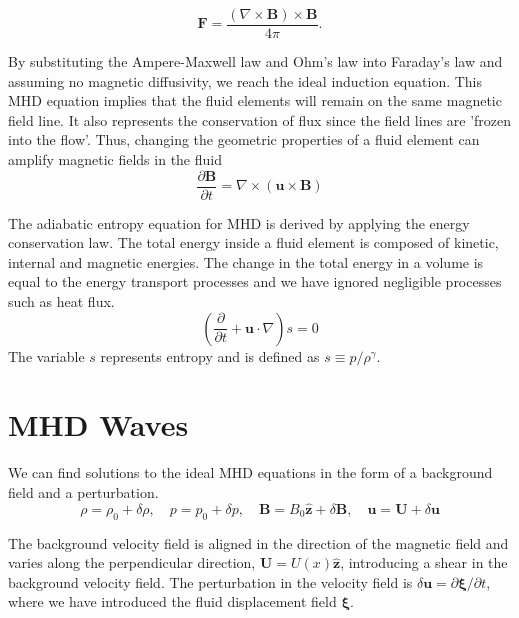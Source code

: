 \begin{equation*}
    \boldsymbol{F} = \frac{(\nabla \times \boldsymbol{B}) \times \boldsymbol{B}}{4\pi}.
\end{equation*}

By substituting the Ampere-Maxwell law and Ohm's law into Faraday's law and assuming no magnetic diffusivity, we reach the ideal induction equation. This MHD equation implies that the fluid elements will remain on the same magnetic field line. It also represents the conservation of flux since the field lines are 'frozen into the flow'. Thus, changing the geometric properties of a fluid element can amplify magnetic fields in the fluid
\begin{equation}
    \label{eq:Induction eq} 
    \frac{\partial \boldsymbol{B}}{\partial t}= \nabla \times (\boldsymbol{u} \times \boldsymbol{B})
\end{equation}

The adiabatic entropy equation for MHD is derived by applying the energy conservation law. The total energy inside a fluid element is composed of kinetic, internal and magnetic energies. The change in the total energy in a volume is equal to the energy transport processes and we have ignored negligible processes such as heat flux. 
\begin{equation}
    \left( \frac{\partial }{\partial t} + \boldsymbol{u} \cdot \nabla \right)s=0
    \label{eq:Energy cons}
\end{equation}
The variable \(s\) represents entropy and is defined as \(s\equiv p/\rho^{\gamma}\).

\section{MHD Waves}
We can find solutions to the ideal MHD equations in the form of a background field and a perturbation. 
\begin{equation*}
    \rho= \rho_{0} + \delta \rho, \quad p= p_{0} + \delta p,  \quad  \boldsymbol{B}= B_{0}\hat{\boldsymbol{z}} + \delta \boldsymbol{B}, \quad \boldsymbol{u}= \boldsymbol{U} + \delta \boldsymbol{u} 
\end{equation*}

The background velocity field is aligned in the direction of the magnetic field and varies along the perpendicular direction, \(\boldsymbol{U}= U(x) \hat{\boldsymbol{z}}\), introducing a shear in the background velocity field. The perturbation in the velocity field is \(\delta \boldsymbol{u} = \partial\boldsymbol{\xi}/\partial t\), where we have introduced the fluid displacement field \(\boldsymbol{\xi}\).

